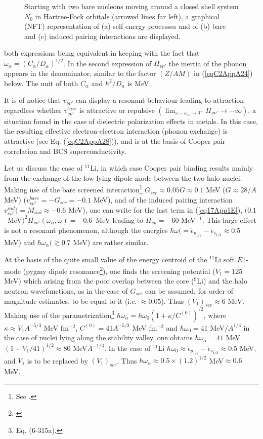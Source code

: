 \begin{subappendices}
\begin{figure}
   \caption{Starting with two bare nucleons moving around a closed shell system $N_0$ in Hartree-Fock orbitals (arrowed lines far left), a graphical (NFT) representation of (a) self energy processes and of (b) bare and (c) induced pairing interactions are displayed.}\label{fig3_A_3}
   \end{figure}
both expressions being equivalent in keeping with the fact that $\omega_\alpha=(C_\alpha/D_\alpha)^{1/2}$. In the second expression of $\Pi_{\nu\nu'}$  the inertia of the phonon appears in the denominator, similar to the factor $(Z/AM)$  in (\ref{eqC2AppA24}) below. The unit of both $C_\alpha$ and $\hbar^2/D_\alpha$ is  MeV.

It is of notice that $v_{\nu\nu'}$ can display a resonant behaviour leading to attraction regardless whether $v_{\nu\nu'}^{bare}$ is attractive or repulsive $(\lim_{\omega-\omega_\alpha\to0^-}\Pi_{\nu\nu'}\to-\infty)$, a situation found in the case of dielectric polarization effects in metals. In this case, the resulting effective electron-electron interaction (phonon exchange) is attractive (see Eq. (\ref{eqC2AppA28})), and is at the basis of Cooper pair correlation and BCS superconductivity.

Let us discuss the case of $^{11}$Li, in which case Cooper pair binding results mainly from the exchange of the low-lying dipole mode between the two halo nuclei. Making use of the bare screened interaction\footnote{See \cite{Broglia:19b}.} $G_{scr}\approx0.05G\approx0.1$ MeV ($G\approx 28/A$ MeV) ($v_{\nu\nu'}^{bare}=-G_{scr}=-0.1$ MeV), and of the induced pairing interaction $v^{ind}_{\nu\nu'}(=M_{ind}\approx-0.6$ MeV), one can write for the last term in (\ref{eq17App1E}), \mbox{$(0.1$ MeV$)^2\Pi_{\nu\nu'}(\omega_\alpha,\omega)=-0.6$ MeV} leading to $\Pi_{\nu\nu}=-60$ MeV$^{-1}$. This large effect is not a resonant phenomenon, although the energies $\hbar\omega(=\tilde\epsilon_{p_{1/2}}-\tilde\epsilon_{s_{1/2}}\approx0.5$ MeV) and $\hbar\omega_\alpha(\gtrsim0.7$ MeV) are rather similar. 

At the basis of the quite small value of the energy centroid of the $^{11}$Li soft $E1$-mode (pygmy dipole resonance\footnote{\cite{Broglia:19}}), one finds the screening potential ($V_1=125$ MeV) which arising from the poor overlap between the core ($^9$Li) and the halo neutron wavefunctions, as in the case of $G_{scr}$ can be assumed, for order of magnitude estimates, to be equal to it (i.e. $\approx0.05$). Thus $(V_1)_{scr}\approx6$ MeV. Making use of the parametrization\footnote{\cite{Bohr:75} Eq. (6-315a).} $\hbar\omega_\alpha=\hbar\omega_0\left(1+\kappa/C^{(0)}\right)^{/2}$, where $\kappa\approx V_1 A^{-5/3}$ MeV fm$^{-2}$, $C^{(0)}=41A^{-5/3}$ MeV fm$^{-2}$ and $\hbar\omega_0=41$ MeV$/A^{1/3}$ in the case of nuclei lying along the stability valley, one obtains $\hbar\omega_\alpha=41$ MeV$\left(1+V_1/41\right)^{1/2}\approx80$ MeV$A^{-1/3}$. In the case of $^{11}$Li $\hbar\omega_0\approx\tilde\epsilon_{p_{1/2}}-\tilde\epsilon_{s_{1/2}}\approx0.5$ MeV, and $V_1$ is to be replaced by $(V_1)_{scr}$. Thus $\hbar\omega_\alpha\approx0.5\times(1.2)^{1/2}$  MeV$\approx0.6$ MeV.


\end{subappendices}
